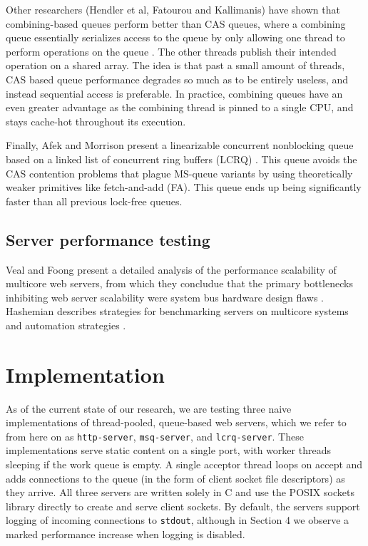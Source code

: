 \documentclass[twoside]{article}
\begin{document}
\begin{multicols}{2}
Other researchers (Hendler et al, Fatourou and Kallimanis) have shown
that combining-based queues perform better than CAS queues, where a
combining queue essentially serializes access to the queue by only
allowing one thread to perform operations on the queue \cite{He10,
  FK12}. The other threads publish their intended operation on a
shared array. The idea is that past a small amount of threads, CAS
based queue performance degrades so much as to be entirely useless,
and instead sequential access is preferable. In practice, combining
queues have an even greater advantage as the combining thread is
pinned to a single CPU, and stays cache-hot throughout its execution.

Finally, Afek and Morrison present a linearizable concurrent
nonblocking queue based on a linked list of concurrent ring buffers
(LCRQ) \cite{AM13}. This queue avoids the CAS contention problems that
plague MS-queue variants by using theoretically weaker primitives like
fetch-and-add (FA). This queue ends up being significantly faster than
all previous lock-free queues.

\subsection{Server performance testing}

Veal and Foong present a detailed analysis of the performance
scalability of multicore web servers, from which they concludue that
the primary bottlenecks inhibiting web server scalability were system
bus hardware design flaws \cite{veal2007performance}. Hashemian
describes strategies for benchmarking servers on multicore systems and
automation strategies \cite{hashemian2013improving}.

\section{Implementation}
As of the current state of our research, we are testing three naive
implementations of thread-pooled, queue-based web servers, which we
refer to from here on as \verb+http-server+, \verb+msq-server+, and
\verb+lcrq-server+. These implementations serve static content on a
single port, with worker threads sleeping if the work queue is
empty. A single acceptor thread loops on accept and adds connections
to the queue (in the form of client socket file descriptors) as they
arrive. All three servers are written solely in C and use the POSIX
sockets library directly to create and serve client sockets. By
default, the servers support logging of incoming connections to
\verb+stdout+, although in Section 4 we observe a marked performance
increase when logging is disabled.


\end{multicols}
\end{document}
